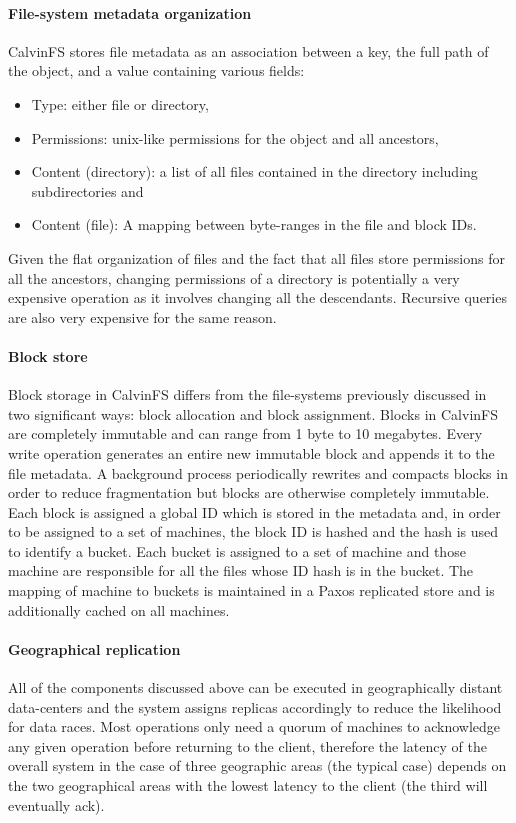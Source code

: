 \paragraph{File-system metadata organization} CalvinFS stores file metadata as an association between a key, the full path of the object, and a value containing various fields: \begin{itemize}
    \item Type: either file or directory,
    \item Permissions: unix-like permissions for the object and all ancestors,
    \item Content (directory): a list of all files contained in the directory including subdirectories and
    \item Content (file): A mapping between byte-ranges in the file and block IDs.
\end{itemize}

Given the flat organization of files and the fact that all files store permissions for all the ancestors, changing permissions of a directory is potentially a very expensive operation as it involves changing all the descendants.
Recursive queries are also very expensive for the same reason.

\paragraph{Block store} Block storage in CalvinFS differs from the file-systems previously discussed in two significant ways: block allocation and block assignment.
Blocks in CalvinFS are completely immutable and can range from 1 byte to 10 megabytes.
Every write operation generates an entire new immutable block and appends it to the file metadata.
A background process periodically rewrites and compacts blocks in order to reduce fragmentation but blocks are otherwise completely immutable.
Each block is assigned a global ID which is stored in the metadata and, in order to be assigned to a set of machines, the block ID is hashed and the hash is used to identify a bucket.
Each bucket is assigned to a set of machine and those machine are responsible for all the files whose ID hash is in the bucket.
The mapping of machine to buckets is maintained in a Paxos replicated store and is additionally cached on all machines.

\paragraph{Geographical replication} All of the components discussed above can be executed in geographically distant data-centers and the system assigns replicas accordingly to reduce the likelihood for data races.
Most operations only need a quorum of machines to acknowledge any given operation before returning to the client, therefore the latency of the overall system in the case of three geographic areas (the typical case) depends on the two geographical areas with the lowest latency to the client (the third will eventually ack).